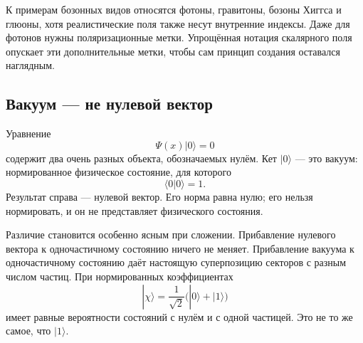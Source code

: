 К примерам бозонных видов относятся фотоны, гравитоны, бозоны Хиггса и глюоны, хотя реалистические поля также несут внутренние индексы. Даже для фотонов нужны поляризационные метки. Упрощённая нотация скалярного поля опускает эти дополнительные метки, чтобы сам принцип создания оставался наглядным.

\subsection{Вакуум — не нулевой вектор}

Уравнение
\begin{equation}
\Psi(x)|0\rangle=0
\end{equation}
содержит два очень разных объекта, обозначаемых нулём. Кет \(|0\rangle\) — это вакуум: нормированное физическое состояние, для которого
\begin{equation}
\langle0|0\rangle=1.
\end{equation}
Результат справа — нулевой вектор. Его норма равна нулю; его нельзя нормировать, и он не представляет физического состояния.

Различие становится особенно ясным при сложении. Прибавление нулевого вектора к одночастичному состоянию ничего не меняет. Прибавление вакуума к одночастичному состоянию даёт настоящую суперпозицию секторов с разным числом частиц. При нормированных коэффициентах
\begin{equation}
|\chi\rangle=\frac{1}{\sqrt2}\bigl(|0\rangle+|1\rangle\bigr)
\end{equation}
имеет равные вероятности состояний с нулём и с одной частицей. Это не то же самое, что \(|1\rangle\).

\begin{classroomqa}
\end{classroomqa}

\begin{classroomqa}
\end{classroomqa}

